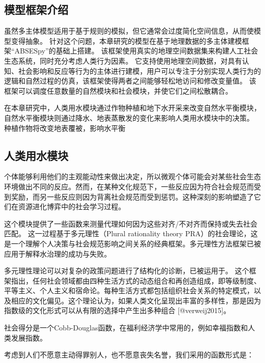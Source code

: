 \subsection{模型框架介绍}

虽然多主体模型适用于基于规则的模拟，但它通常会过度简化空间信息，从而使模型变得抽象。
针对这个问题，本章研究的模型在基于地理数据的多主体建模框架“ABSESpy”的基础上搭建。
该框架使用真实的地理空间数据集来构建人工社会生态系统，同时充分考虑人类行为因素。
它支持使用地理空间数据，对具有认知、社会影响和反应等行为的主体进行建模，用户可以专注于分别实现人类行为的逻辑和自然过程的仿真，该框架使得两者之间能够轻松地访问和修改变量值。
该框架可以调度任意数量的自然模块和社会模块，并使它们之间松散耦合。

在本章研究中，人类用水模块通过作物种植和地下水开采来改变自然水平衡模块，自然水平衡模块则通过降水、地表蒸散发的变化来影响人类用水模块中的决策。
种植作物将改变地表覆被，影响水平衡

\subsection{人类用水模块}

个体能够利用他们的主观能动性来做出决定，所以微观个体可能会对某些社会生态环境做出不同的反应。然而，在某种文化规范下，一些反应因为符合社会规范而受到奖励，而另一些反应则因为背离社会规范而受到惩罚。这种深刻的影响塑造了它们在资源进化博弈中的社会学习过程。

这个模块提供了一些函数来测量代理如何因为这些对齐/不对齐而保持或失去社会匹配。
这一过程基于多元理性（Plural rationality theory PRA）的社会理论，这是一个理解个人决策与社会规范影响之间关系的经典框架。多元理性方法框架已被应用于解释水治理的成功与失败。  %

多元理性理论可以对复杂的政策问题进行了结构化的诊断，已被运用于。
这个框架指出，任何社会领域都由四种生活方式的动态组合和再创造组成，即等级制度、平等主义、个人主义和宿命论。每种生活方式都包括组织社会关系的特定模式，以及相应的文化偏见。这个理论认为，如果人类文化呈现出丰富的多样性，那是因为指数级的文化形式可以从有限的选择中产生出多种组合 [@verweij2015]。

社会得分是一个Cobb-Douglas函数，在福利经济学中常用的，例如幸福指数和人类发展指数。

考虑到人们不愿意主动得罪别人，也不愿意丧失名誉，我们采用的函数形式是：


